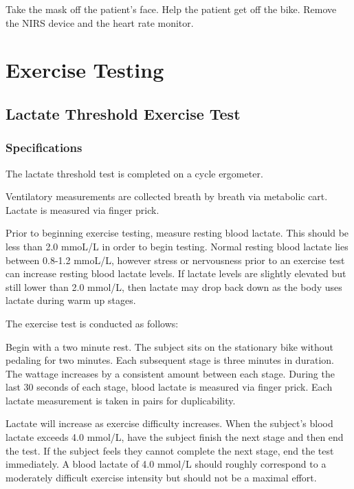 \documentclass[
]{book}
\begin{document}
Take the mask off the patient's face. Help the patient get off the bike. Remove the NIRS device and the heart rate monitor.

\hypertarget{ExerciseTesting}{%
\chapter{Exercise Testing}\label{ExerciseTesting}}

\hypertarget{ExerciseTesting-LT}{%
\section{Lactate Threshold Exercise Test}\label{ExerciseTesting-LT}}

\hypertarget{ExerciseTesting-LT-Specs}{%
\subsection{Specifications}\label{ExerciseTesting-LT-Specs}}

The lactate threshold test is completed on a cycle ergometer.

Ventilatory measurements are collected breath by breath via metabolic cart.
Lactate is measured via finger prick.

Prior to beginning exercise testing, measure resting blood lactate. This should be less than 2.0 mmoL/L in order to begin testing. Normal resting blood lactate lies between 0.8-1.2 mmoL/L, however stress or nervousness prior to an exercise test can increase resting blood lactate levels. If lactate levels are slightly elevated but still lower than 2.0 mmol/L, then lactate may drop back down as the body uses lactate during warm up stages.

The exercise test is conducted as follows:

Begin with a two minute rest. The subject sits on the stationary bike without pedaling for two minutes.
Each subsequent stage is three minutes in duration. The wattage increases by a consistent amount between each stage. During the last 30 seconds of each stage, blood lactate is measured via finger prick. Each lactate measurement is taken in pairs for duplicability.

Lactate will increase as exercise difficulty increases. When the subject's blood lactate exceeds 4.0 mmol/L, have the subject finish the next stage and then end the test. If the subject feels they cannot complete the next stage, end the test immediately. A blood lactate of 4.0 mmol/L should roughly correspond to a moderately difficult exercise intensity but should not be a maximal effort.
\end{document}
